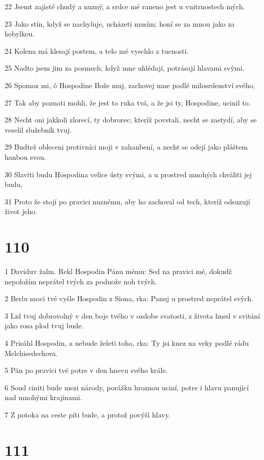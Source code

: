 \par 22 Jsemt zajisté chudý a nuzný, a srdce mé raneno jest u vnitrnostech mých.
\par 23 Jako stín, když se nachyluje, ucházeti musím; honí se za mnou jako za kobylkou.
\par 24 Kolena má klesají postem, a telo mé vyschlo z tucnosti.
\par 25 Nadto jsem jim za posmech; když mne uhlédají, potrásají hlavami svými.
\par 26 Spomoz mi, ó Hospodine Bože muj, zachovej mne podlé milosrdenství svého,
\par 27 Tak aby poznati mohli, že jest to ruka tvá, a že jsi ty, Hospodine, ucinil to.
\par 28 Necht oni jakkoli zlorecí, ty dobrorec; kteríž povstali, necht se zastydí, aby se veselil služebník tvuj.
\par 29 Budtež obleceni protivníci moji v zahanbení, a necht se odejí jako pláštem hanbou svou.
\par 30 Slaviti budu Hospodina velice ústy svými, a u prostred mnohých chváliti jej budu,
\par 31 Proto že stojí po pravici nuznému, aby ho zachoval od tech, kteríž odsuzují život jeho.

\chapter{110}

\par 1 Daviduv žalm. Rekl Hospodin Pánu mému: Sed na pravici mé, dokudž nepoložím neprátel tvých za podnože noh tvých.
\par 2 Berlu moci tvé vyšle Hospodin z Siona, rka: Panuj u prostred neprátel svých.
\par 3 Lid tvuj dobrovolný v den boje tvého v ozdobe svatosti, z života hned v svitání jako rosa plod tvuj bude.
\par 4 Prisáhl Hospodin, a nebude želeti toho, rka: Ty jsi knez na veky podlé rádu Melchisedechova.
\par 5 Pán po pravici tvé potre v den hnevu svého krále.
\par 6 Soud ciniti bude mezi národy, porážku hroznou uciní, potre i hlavu panující nad mnohými krajinami.
\par 7 Z potoka na ceste píti bude, a protož povýší hlavy.

\chapter{111}

